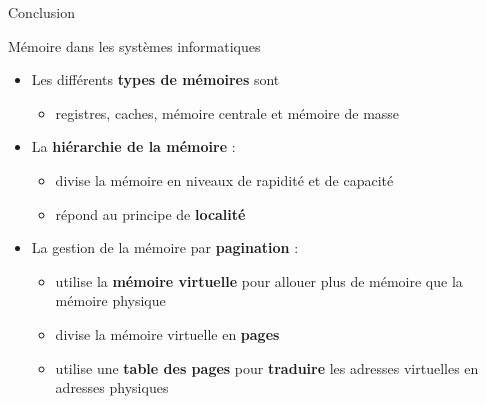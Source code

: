 \documentclass[8pt]{beamer}
\begin{document}
\begin{frame}{Conclusion}
    \begin{block}{Mémoire dans les systèmes informatiques}
        \begin{itemize}
            \item Les différents \textbf{types de mémoires} sont
                  \begin{itemize}
                      \item registres, caches, mémoire centrale et mémoire de
                            masse
                  \end{itemize}
            \item La \textbf{hiérarchie de la mémoire} :
                  \begin{itemize}
                      \item divise la mémoire en niveaux de rapidité et de
                            capacité
                      \item r\'epond au principe de \textbf{localité}
                  \end{itemize}
            \item La gestion de la mémoire par \textbf{pagination} :
                  \begin{itemize}
                      \item utilise la \textbf{mémoire virtuelle} pour allouer
                            plus de
                            mémoire que la mémoire physique
                      \item divise la mémoire virtuelle en \textbf{pages}
                      \item utilise une \textbf{table des pages} pour
                            \textbf{traduire} les
                            adresses
                            virtuelles en adresses physiques
                  \end{itemize}
        \end{itemize}
    \end{block}


\end{frame}
\end{document}
